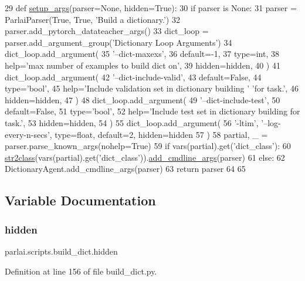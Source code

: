 \begin{DoxyCode}
29 \textcolor{keyword}{def }\hyperlink{namespaceparlai_1_1scripts_1_1build__dict_a01e78707ace903aa772ada53fafe7067}{setup\_args}(parser=None, hidden=True):
30     \textcolor{keywordflow}{if} parser \textcolor{keywordflow}{is} \textcolor{keywordtype}{None}:
31         parser = ParlaiParser(\textcolor{keyword}{True}, \textcolor{keyword}{True}, \textcolor{stringliteral}{'Build a dictionary.'})
32     parser.add\_pytorch\_datateacher\_args()
33     dict\_loop = parser.add\_argument\_group(\textcolor{stringliteral}{'Dictionary Loop Arguments'})
34     dict\_loop.add\_argument(
35         \textcolor{stringliteral}{'--dict-maxexs'},
36         default=-1,
37         type=int,
38         help=\textcolor{stringliteral}{'max number of examples to build dict on'},
39         hidden=hidden,
40     )
41     dict\_loop.add\_argument(
42         \textcolor{stringliteral}{'--dict-include-valid'},
43         default=\textcolor{keyword}{False},
44         type=\textcolor{stringliteral}{'bool'},
45         help=\textcolor{stringliteral}{'Include validation set in dictionary building '} \textcolor{stringliteral}{'for task.'},
46         hidden=hidden,
47     )
48     dict\_loop.add\_argument(
49         \textcolor{stringliteral}{'--dict-include-test'},
50         default=\textcolor{keyword}{False},
51         type=\textcolor{stringliteral}{'bool'},
52         help=\textcolor{stringliteral}{'Include test set in dictionary building for task.'},
53         hidden=hidden,
54     )
55     dict\_loop.add\_argument(
56         \textcolor{stringliteral}{'-ltim'}, \textcolor{stringliteral}{'--log-every-n-secs'}, type=float, default=2, hidden=hidden
57     )
58     partial, \_ = parser.parse\_known\_args(nohelp=\textcolor{keyword}{True})
59     \textcolor{keywordflow}{if} vars(partial).get(\textcolor{stringliteral}{'dict\_class'}):
60         \hyperlink{namespaceparlai_1_1core_1_1params_aa6083a72ad328d26016bd5f805a0b1c8}{str2class}(vars(partial).get(\textcolor{stringliteral}{'dict\_class'})).\hyperlink{namespaceparlai_1_1agents_1_1drqa_1_1config_a62fdd5554f1da6be0cba185271058320}{add\_cmdline\_args}(parser)
61     \textcolor{keywordflow}{else}:
62         DictionaryAgent.add\_cmdline\_args(parser)
63     \textcolor{keywordflow}{return} parser
64 
65 
\end{DoxyCode}


\subsection{Variable Documentation}
\mbox{\label{namespaceparlai_1_1scripts_1_1build__dict_ab1670dd829e6129c8e3da84dd474da60}} 
\subsubsection{\texorpdfstring{hidden}{hidden}}
{\footnotesize\ttfamily parlai.\+scripts.\+build\+\_\+dict.\+hidden}



Definition at line 156 of file build\+\_\+dict.\+py.

